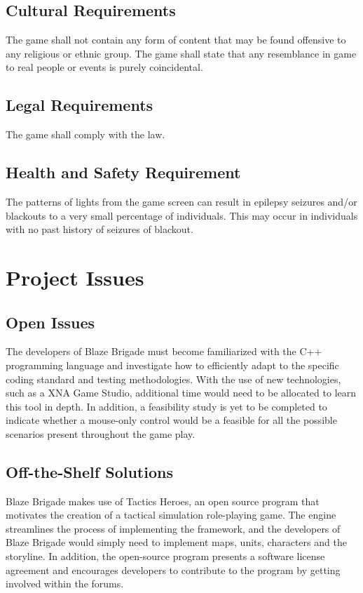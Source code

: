 \documentclass{article}
\begin{document}
\subsection{Cultural Requirements}

The game shall not contain any form of content that may be found offensive to any religious or ethnic group. The game shall state that any resemblance in game to real people or events is purely coincidental.

\subsection{Legal Requirements}

The game shall comply with the law.

\subsection{Health and Safety Requirement}

The patterns of lights from the game screen can result in epilepsy seizures and/or blackouts to a very small percentage of individuals. This may occur in individuals with no past history of seizures of blackout.

\section{Project Issues}

\subsection{Open Issues}
The developers of Blaze Brigade must become familiarized with the C++ programming language and investigate how to efficiently adapt to the specific coding standard and testing methodologies. With the use of new technologies, such as a XNA Game Studio, additional time would need to be allocated to learn this tool in depth. In addition, a feasibility study is yet to be completed to indicate whether a mouse-only control would be a feasible for all the possible scenarios present throughout the game play.

\subsection{Off-the-Shelf Solutions}
Blaze Brigade makes use of Tactics Heroes, an open source program that motivates the creation of a tactical simulation role-playing game. The engine streamlines the process of implementing the framework, and the developers of Blaze Brigade would simply need to implement maps, units, characters and the storyline. In addition, the open-source program presents a software license agreement and encourages developers to contribute to the program by getting involved within the forums.
\end{document}
